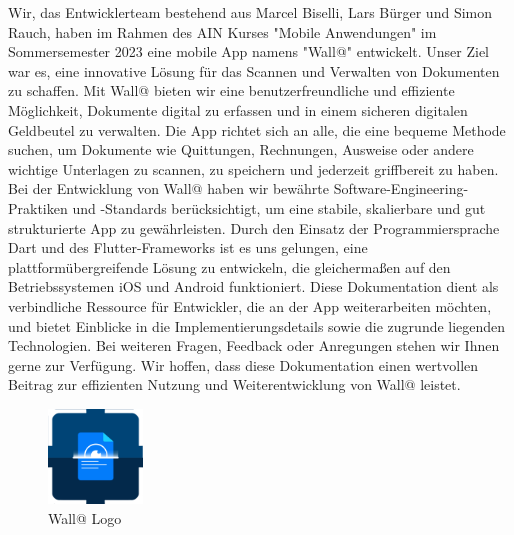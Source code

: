 Wir, das Entwicklerteam bestehend aus Marcel Biselli, Lars Bürger und Simon Rauch, haben im Rahmen des AIN Kurses "Mobile Anwendungen" 
im Sommersemester 2023 eine mobile App namens "Wall@" entwickelt. 
Unser Ziel war es, eine innovative Lösung für das Scannen und Verwalten von Dokumenten zu schaffen.
\newline
\newline
Mit Wall@ bieten wir eine benutzerfreundliche und effiziente Möglichkeit, Dokumente digital zu erfassen und in einem sicheren digitalen Geldbeutel zu verwalten. 
Die App richtet sich an alle, die eine bequeme Methode suchen, um Dokumente wie Quittungen, Rechnungen, Ausweise oder andere wichtige Unterlagen zu scannen, 
zu speichern und jederzeit griffbereit zu haben.
\newline
\newline
Bei der Entwicklung von Wall@ haben wir bewährte Software-Engineering-Praktiken und -Standards berücksichtigt, 
um eine stabile, skalierbare und gut strukturierte App zu gewährleisten. 
Durch den Einsatz der Programmiersprache Dart und des Flutter-Frameworks ist es uns gelungen, eine plattformübergreifende Lösung zu entwickeln, 
die gleichermaßen auf den Betriebssystemen iOS und Android funktioniert.
\newline
\newline
Diese Dokumentation dient als verbindliche Ressource für Entwickler, die an der App weiterarbeiten möchten, 
und bietet Einblicke in die Implementierungsdetails sowie die zugrunde liegenden Technologien.
\newline
\newline
Bei weiteren Fragen, Feedback oder Anregungen stehen wir Ihnen gerne zur Verfügung. 
Wir hoffen, dass diese Dokumentation einen wertvollen Beitrag zur effizienten Nutzung und Weiterentwicklung von Wall@ leistet.

\begin{figure}[h!]
  \centering
  \includegraphics[width=0.225\textwidth]{figures/logo.png}
  \caption{Wall@ Logo}
  \label{fig:logo}
\end{figure}